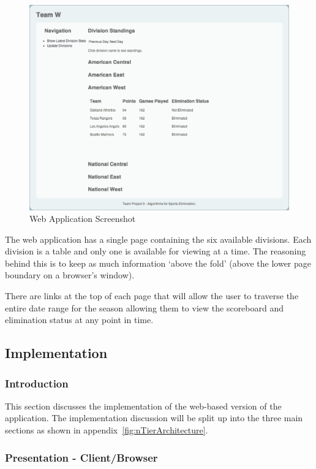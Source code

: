 \begin{figure}
\includegraphics[width=\linewidth,keepaspectratio]
{images/webAppScreenshot.png}
\caption{Web Application Screenshot}
\label{fig:webAppScreenshot}
\end{figure}

The web application has a single page containing the six available divisions.
Each division is a table and only one is available for viewing at a time. The
reasoning behind this is to keep as much information `above the fold' (above the
lower page boundary on a browser's window).

There are links at the top of each page that will allow the user to traverse
the entire date range for the season allowing them to view the scoreboard and
elimination status at any point in time.

\subsection{Implementation}

\subsubsection{Introduction}

This section discusses the implementation of the web-based version of the
application. The implementation discussion will be split up into the three
main sections as shown in appendix~\ref{fig:nTierArchitecture}.

\subsubsection{Presentation - Client/Browser}

